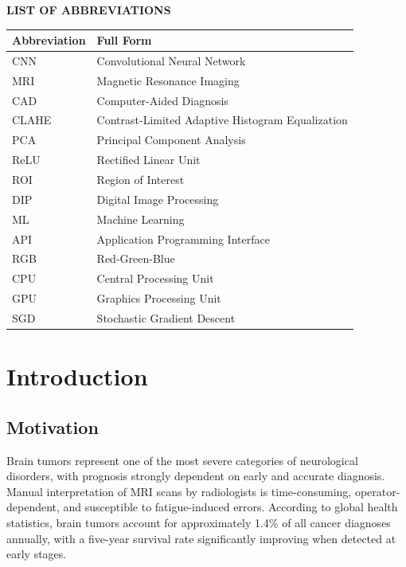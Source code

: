 \documentclass[12pt,a4paper]{article}
\begin{document}
\newpage
\begin{center}
    {\Large\textbf{LIST OF ABBREVIATIONS}}
\end{center}

\begin{table}[H]
\centering
\begin{tabular}{|l|l|}
\hline
\textbf{Abbreviation} & \textbf{Full Form} \\ \hline
CNN & Convolutional Neural Network \\
MRI & Magnetic Resonance Imaging \\
CAD & Computer-Aided Diagnosis \\
CLAHE & Contrast-Limited Adaptive Histogram Equalization \\
PCA & Principal Component Analysis \\
ReLU & Rectified Linear Unit \\
ROI & Region of Interest \\
DIP & Digital Image Processing \\
ML & Machine Learning \\
API & Application Programming Interface \\
RGB & Red-Green-Blue \\
CPU & Central Processing Unit \\
GPU & Graphics Processing Unit \\
SGD & Stochastic Gradient Descent \\
\hline
\end{tabular}
\end{table}

\newpage

\section{Introduction}

\subsection{Motivation}

Brain tumors represent one of the most severe categories of neurological disorders, with prognosis strongly dependent on early and accurate diagnosis. Manual interpretation of MRI scans by radiologists is time-consuming, operator-dependent, and susceptible to fatigue-induced errors. According to global health statistics, brain tumors account for approximately 1.4\% of all cancer diagnoses annually, with a five-year survival rate significantly improving when detected at early stages.
\end{document}

